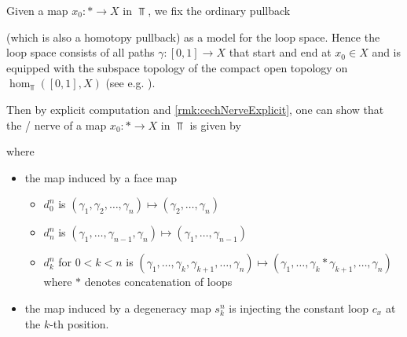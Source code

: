 \begin{remark}
    Given a map $x_0\colon*\to X$ in $\Top$, we fix the ordinary pullback
    \begin{center}
    \end{center}
    (which is also a homotopy pullback) as a model for the loop space.
    Hence the loop space consists of all paths $\gamma\colon [0,1]\to X$ that start and end at $x_0\in X$ and is equipped with the subspace topology of the compact open topology on $\hom_{\Top}\left([0,1],X\right)$ (see e.g. \cite[Definition 1.2.1]{cubical_htpy_theory}).
    
    Then by explicit computation and \cref{rmk:cechNerveExplicit}, one can show that the \Cech/ nerve of a map $x_0\colon*\to X$ in $\Top$ is given by
    \begin{center}
    \end{center}
    where
    \begin{itemize}
        \item the map induced by a face map 
        \begin{itemize}
            \item $d_0^n$ is $(\gamma_1,\gamma_2,\ldots,\gamma_n)\mapsto(\gamma_2,\ldots,\gamma_n)$
            \item $d_n^n$ is $(\gamma_1,\ldots,\gamma_{n-1},\gamma_n)\mapsto(\gamma_1,\ldots,\gamma_{n-1})$
            \item $d_k^n$ for $0<k<n$ is $(\gamma_1,\ldots,\gamma_k,\gamma_{k+1},\ldots,\gamma_n)\mapsto(\gamma_1,\ldots,\gamma_k*\gamma_{k+1},\ldots,\gamma_n)$ where $*$ denotes concatenation of loops
        \end{itemize}
        \item the map induced by a degeneracy map $s_k^n$ is injecting the constant loop $c_x$ at the $k$-th position.
    \end{itemize}
\end{remark}
